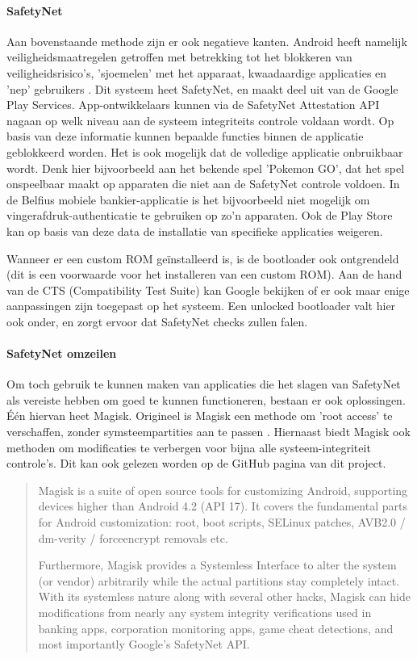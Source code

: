 \paragraph{SafetyNet}

Aan bovenstaande methode zijn er ook negatieve kanten. Android heeft namelijk veiligheidsmaatregelen getroffen met betrekking tot het blokkeren van veiligheidsrisico's, 'sjoemelen' met het apparaat, kwaadaardige applicaties en 'nep' gebruikers \autocite{android_safetynet}. Dit systeem heet SafetyNet, en maakt deel uit van de Google Play Services. App-ontwikkelaars kunnen via de SafetyNet Attestation API nagaan op welk niveau aan de systeem integriteits controle voldaan wordt. Op basis van deze informatie kunnen bepaalde functies binnen de applicatie geblokkeerd worden. Het is ook mogelijk dat de volledige applicatie onbruikbaar wordt. Denk hier bijvoorbeeld aan het bekende spel 'Pokemon GO', dat het spel onspeelbaar maakt op apparaten die niet aan de SafetyNet controle voldoen. In de Belfius mobiele bankier-applicatie is het bijvoorbeeld niet mogelijk om vingerafdruk-authenticatie te gebruiken op zo'n apparaten. Ook de Play Store kan op basis van deze data de installatie van specifieke applicaties weigeren.

Wanneer er een custom ROM geïnstalleerd is, is de bootloader ook ontgrendeld (dit is een voorwaarde voor het installeren van een custom ROM). Aan de hand van de CTS (Compatibility Test Suite) kan Google bekijken of er ook maar enige aanpassingen zijn toegepast op het systeem. Een unlocked bootloader valt hier ook onder, en zorgt ervoor dat SafetyNet checks zullen falen.

\paragraph{SafetyNet omzeilen}
Om toch gebruik te kunnen maken van applicaties die het slagen van SafetyNet als vereiste hebben om goed te kunnen functioneren, bestaan er ook oplossingen. Één hiervan heet Magisk. Origineel is Magisk een methode om 'root access' te verschaffen, zonder symsteempartities aan te passen \autocite{topjohnwu_magisk}. Hiernaast biedt Magisk ook methoden om modificaties te verbergen voor bijna alle systeem-integriteit controle's. Dit kan ook gelezen worden op de GitHub pagina van dit project.
\blockcquote{topjohnwu_magiskgithub}{
 Magisk is a suite of open source tools for customizing Android, supporting devices higher than Android 4.2 (API 17). It covers the fundamental parts for Android customization: root, boot scripts, SELinux patches, AVB2.0 / dm-verity / forceencrypt removals etc.
 
 Furthermore, Magisk provides a Systemless Interface to alter the system (or vendor) arbitrarily while the actual partitions stay completely intact. With its systemless nature along with several other hacks, Magisk can hide modifications from nearly any system integrity verifications used in banking apps, corporation monitoring apps, game cheat detections, and most importantly Google's SafetyNet API.
}

